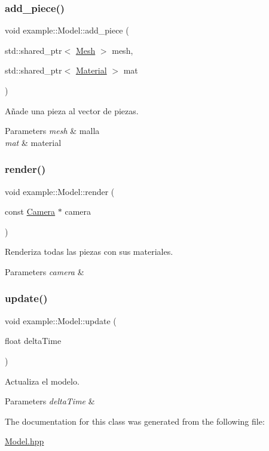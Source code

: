 \subsubsection{\texorpdfstring{add\_piece()}{add\_piece()}}
{\footnotesize\ttfamily void example\+::\+Model\+::add\+\_\+piece (\begin{DoxyParamCaption}\item[{std\+::shared\+\_\+ptr$<$ \mbox{\hyperlink{classexample_1_1_mesh}{Mesh}} $>$}]{mesh,  }\item[{std\+::shared\+\_\+ptr$<$ \mbox{\hyperlink{classexample_1_1_material}{Material}} $>$}]{mat }\end{DoxyParamCaption})}



Añade una pieza al vector de piezas. 


\begin{DoxyParams}{Parameters}
{\em mesh} & malla \\
\hline
{\em mat} & material \\
\hline
\end{DoxyParams}
\mbox{\label{classexample_1_1_model_a685a05967dbfc7204e501f5534553a54}} 
\subsubsection{\texorpdfstring{render()}{render()}}
{\footnotesize\ttfamily void example\+::\+Model\+::render (\begin{DoxyParamCaption}\item[{const \mbox{\hyperlink{classexample_1_1_camera}{Camera}} $\ast$}]{camera }\end{DoxyParamCaption})}



Renderiza todas las piezas con sus materiales. 


\begin{DoxyParams}{Parameters}
{\em camera} & \\
\hline
\end{DoxyParams}
\mbox{\label{classexample_1_1_model_a6070718d4527d2e659241097b3bed3b6}} 
\subsubsection{\texorpdfstring{update()}{update()}}
{\footnotesize\ttfamily void example\+::\+Model\+::update (\begin{DoxyParamCaption}\item[{float}]{delta\+Time }\end{DoxyParamCaption})}



Actualiza el modelo. 


\begin{DoxyParams}{Parameters}
{\em delta\+Time} & \\
\hline
\end{DoxyParams}


The documentation for this class was generated from the following file\+:\begin{DoxyCompactItemize}
\item 
\mbox{\hyperlink{_model_8hpp}{Model.\+hpp}}\end{DoxyCompactItemize}

